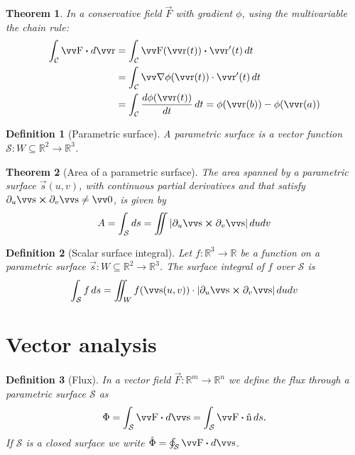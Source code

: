 \documentclass[twocolumn, margin=small]{tex/hsrzf}
\theoremstyle{fuvarzf}
\newtheorem{theorem}{Theorem}
\newtheorem{definition}{Definition}
\begin{document}
\begin{theorem}
  In a conservative field \(\vec{F}\) with gradient \(\phi\), using the
  multivariable the chain rule:
  \begin{align*}
    \int_\mathcal{C} \vec{F} \dotp d\vec{r} 
    &= \int_\mathcal{C} \vec{F}(\vec{r}(t)) \dotp \vec{r}'(t) \,dt \\
    &= \int_\mathcal{C} \grad \phi(\vec{r}(t)) \cdot \vec{r}'(t) \,dt \\
    &= \int_\mathcal{C} \frac{d\phi(\vec{r}(t))}{dt}\,dt
    = \phi(\vec{r}(b)) - \phi(\vec{r}(a))
  \end{align*}
\end{theorem}

\begin{definition}[Parametric surface]
  A parametric surface is a vector function \(\mathcal{S}: W \subseteq \mathbb{R}^2 \to
  \mathbb{R}^3\).
\end{definition}

\begin{theorem}[Area of a parametric surface]
  The area spanned by a parametric surface \(\vec{s}(u,v)\), with continuous
  partial derivatives and that satisfy \(\partial_u \vec{s} \crossp \partial_v
  \vec{s} \neq \vec{0}\), is given by
  \[
    A = \int_\mathcal{S} ds 
      = \iint |\partial_u \vec{s} \crossp \partial_v \vec{s}| \,dudv
  \]
\end{theorem}

\begin{definition}[Scalar surface integral]
  Let \(f: \mathbb{R}^3 \to \mathbb{R}\) be a function on a parametric surface
  \(\vec{s}: W \subseteq \mathbb{R}^2 \to \mathbb{R}^3\).  The surface integral
  of \(f\) over \(\mathcal{S}\) is
  \[
    \int_\mathcal{S} f \,ds = 
      \iint_W f(\vec{s}(u,v)) \cdot 
        |\partial_u \vec{s} \crossp \partial_v \vec{s}| \,dudv
  \]
\end{definition}

\section{Vector analysis}

\begin{definition}[Flux]
  In a vector field \(\vec{F}: \mathbb{R}^m \to \mathbb{R}^n\) we define the
  \emph{flux} through a parametric surface \(\mathcal{S}\) as
  \[
    \Phi = \int_\mathcal{S} \vec{F} \dotp d\vec{s} 
      = \int_\mathcal{S} \vec{F} \dotp \uvec{n} \,ds .
  \]
  If \(\mathcal{S}\) is a closed surface we write
  \(
    \mathring{\Phi} = \oint_\mathcal{S} \vec{F} \dotp d\vec{s}
  \).
\end{definition}
\end{document}
